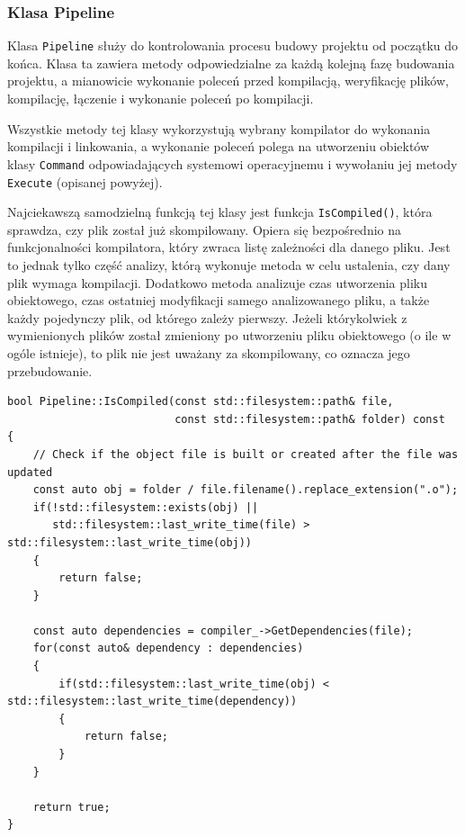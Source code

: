 \subsubsection{Klasa Pipeline}

Klasa \texttt{Pipeline} służy do kontrolowania procesu budowy projektu od początku do końca. Klasa ta zawiera metody odpowiedzialne za każdą kolejną fazę budowania projektu, a mianowicie wykonanie poleceń przed kompilacją, weryfikację plików, kompilację, łączenie i wykonanie poleceń po kompilacji.

Wszystkie metody tej klasy wykorzystują wybrany kompilator do wykonania kompilacji i linkowania, a wykonanie poleceń polega na utworzeniu obiektów klasy \texttt{Command} odpowiadających systemowi operacyjnemu i wywołaniu jej metody \texttt{Execute} (opisanej powyżej).

Najciekawszą samodzielną funkcją tej klasy jest funkcja \texttt{IsCompiled()}, która sprawdza, czy plik został już skompilowany. Opiera się bezpośrednio na funkcjonalności kompilatora, który zwraca listę zależności dla danego pliku. Jest to jednak tylko część analizy, którą wykonuje metoda w celu ustalenia, czy dany plik wymaga kompilacji. Dodatkowo metoda analizuje czas utworzenia pliku obiektowego, czas ostatniej modyfikacji samego analizowanego pliku, a także każdy pojedynczy plik, od którego zależy pierwszy. Jeżeli którykolwiek z wymienionych plików został zmieniony po utworzeniu pliku obiektowego (o ile w ogóle istnieje), to plik nie jest uważany za skompilowany, co oznacza jego przebudowanie.

\begin{lstlisting}[label=list:is_compiled,caption=Implementacja metody Pipeline::IsCompiled(),basicstyle=\footnotesize\ttfamily]
bool Pipeline::IsCompiled(const std::filesystem::path& file,
						  const std::filesystem::path& folder) const
{
	// Check if the object file is built or created after the file was updated
	const auto obj = folder / file.filename().replace_extension(".o");
	if(!std::filesystem::exists(obj) ||
	   std::filesystem::last_write_time(file) > std::filesystem::last_write_time(obj))
	{
		return false;
	}

	const auto dependencies = compiler_->GetDependencies(file);
	for(const auto& dependency : dependencies)
	{
		if(std::filesystem::last_write_time(obj) < std::filesystem::last_write_time(dependency))
		{
			return false;
		}
	}

	return true;
}
\end{lstlisting}

